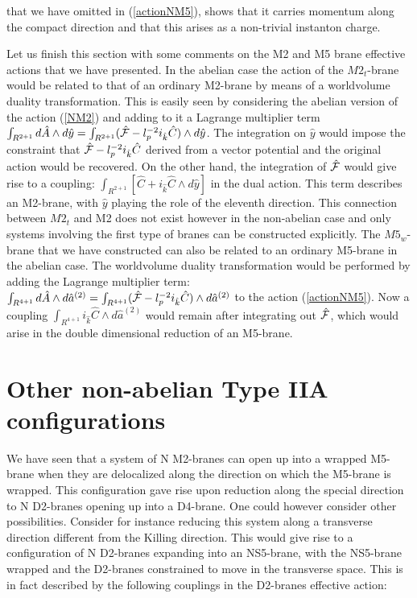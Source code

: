 \documentclass[12pt,a4paper]{article}
\begin{document}
\noindent that we have omitted in (\ref{actionNM5}), shows that it
carries momentum along the compact direction and that this arises as 
a non-trivial instanton charge. 

Let us finish this section with some comments on the M2 and M5 brane
effective actions that we have presented.
In the abelian case the action of the $M2_t$-brane would be related to
that of an ordinary M2-brane by means of a worldvolume duality
transformation. This is easily seen by 
considering the abelian version of the action (\ref{NM2})
and adding to it a Lagrange multiplier term
$\int_{R^{2+1}} d{\hat A}\wedge d{\hat y}=\int_{R^{2+1}}
({\hat {\cal F}}-l_p^{-2}
i_{\hat k}{\hat C})\wedge d{\hat y}$. The integration
on ${\hat y}$ would impose
the constraint that ${\hat {\cal F}}-l_p^{-2}
i_{\hat k}{\hat C}$ derived from a vector potential
and the original action would be recovered. On the other hand, the
integration of ${\hat {\cal F}}$ would give rise to a coupling:
$\int_{R^{2+1}} [{\hat C}+i_{\hat k}{\hat C}\wedge d{\hat y}]$
in the dual action. This term describes an M2-brane, with
${\hat y}$ playing the role of the eleventh direction. 
This connection between $M2_t$ and M2 does not exist however in the
non-abelian case and only systems involving the first type of branes
can be constructed explicitly.
The $M5_w$-brane that we have constructed
can also be related to an ordinary M5-brane in the abelian case.
The worldvolume duality transformation would be performed
by adding the Lagrange multiplier term:
$\int_{R^{4+1}} d{\hat A}\wedge d{\hat a}^{(2)}=\int_{R^{4+1}}
({\hat {\cal F}}-l_p^{-2}i_{\hat k}{\hat C})\wedge d{\hat a}^{(2)}$
to the action (\ref{actionNM5}).
Now a coupling $\int_{R^{4+1}}i_{\hat k}
{\hat C}\wedge d{\hat a}^{(2)}$ would remain after integrating out
${\hat {\cal F}}$, which would arise in the double
dimensional reduction of an M5-brane. 



\section{Other non-abelian Type IIA configurations}

We have seen that a system of N M2-branes
can open up into a wrapped M5-brane when they are delocalized along
the direction on which the M5-brane is wrapped.
This configuration gave rise upon reduction along the special
direction to N D2-branes opening up into a D4-brane. One could
however consider other possibilities. Consider for instance reducing 
this system along a transverse direction different
from the Killing direction.
This would give rise to a configuration of N D2-branes expanding into
an NS5-brane, with the NS5-brane wrapped and the
D2-branes constrained to move in the transverse space. 
This is in fact described by the following couplings in the D2-branes
effective action:
\end{document}
